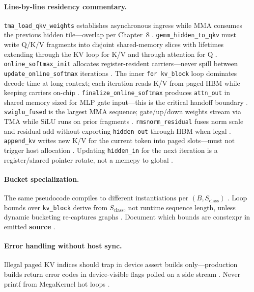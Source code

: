 \paragraph{Line-by-line residency commentary.}
\texttt{tma\_load\_qkv\_weights} establishes asynchronous ingress while MMA consumes the previous hidden tile---overlap per Chapter~8 \citep{semianalysis2024tma,nvidia2022hopper}.
\texttt{gemm\_hidden\_to\_qkv} must write Q/K/V fragments into disjoint shared-memory slices with lifetimes extending through the KV loop for K/V and through attention for Q \citep{dao2022flashattention,yirage2026}.
\texttt{online\_softmax\_init} allocates register-resident carriers---never spill between \texttt{update\_online\_softmax} iterations \citep{dao2022flashattention,memoryfloor2026}.
The inner \texttt{for kv\_block} loop dominates decode time at long context; each iteration reads K/V from paged HBM while keeping carriers on-chip \citep{kwon2023vllm,dao2023flashdecoding}.
\texttt{finalize\_online\_softmax} produces \texttt{attn\_out} in shared memory sized for MLP gate input---this is the critical handoff boundary \citep{taxbreak2026,chen2020compilerbasedhardw}.
\texttt{swiglu\_fused} is the largest MMA sequence; gate/up/down weights stream via TMA while SiLU runs on prior fragments \citep{patel2025llminference,liu2024deepseekv3}.
\texttt{rmsnorm\_residual} fuses norm scale and residual add without exporting \texttt{hidden\_out} through HBM when legal \citep{memoryfloor2026,yirage2026}.
\texttt{append\_kv} writes new K/V for the current token into paged slots---must not trigger host allocation \citep{kwon2023vllm,nvidia2024cudagraphs}.
Updating \texttt{hidden\_in} for the next iteration is a register/shared pointer rotate, not a memcpy to global \citep{taxbreak2026,memoryfloor2026}.

\paragraph{Bucket specialization.} The same pseudocode compiles to different instantiations per $(B, S_{\mathrm{class}})$ \citep{yirage2026,amd2024xdna}. Loop bounds over \texttt{kv\_block} derive from $S_{\mathrm{class}}$, not runtime sequence length, unless dynamic bucketing re-captures graphs \citep{nvidia2024cudagraphs,kwon2023vllm}. Document which bounds are constexpr in emitted \textbf{source} \citep{chen2020compilerbasedhardw,patel2025llminference}.

\paragraph{Error handling without host sync.} Illegal paged KV indices should trap in device assert builds only---production builds return error codes in device-visible flags polled on a side stream \citep{kwon2023vllm,memoryfloor2026}. Never printf from MegaKernel hot loops \citep{taxbreak2026,nvidia2024cudagraphs}.

